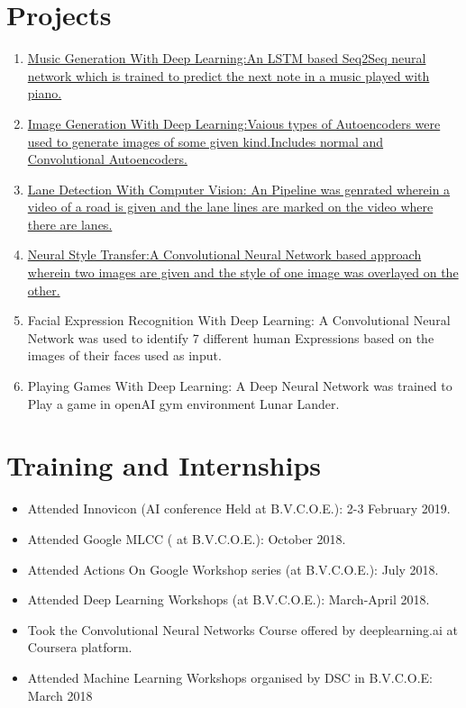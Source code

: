 \documentclass{my_cv}
\begin{document}
	\section{Projects}
	  \begin{enumerate}
	  	\item \href{https://github.com/anuj2110/lstm-music-gen}{Music Generation With Deep Learning:An LSTM based Seq2Seq neural network which is trained to predict the next note in a music played with piano.}
	  	
	  	\item \href{https://github.com/anuj2110/keras}{Image Generation With Deep Learning:Vaious types of Autoencoders were used to generate images of some given kind.Includes normal and Convolutional Autoencoders.}
	  	\item \href{https://github.com/anuj2110/LaneDetection}{ Lane Detection With Computer Vision:
	  		An Pipeline was genrated wherein a video of a road is given and the lane lines are marked on the video where there are lanes.}
	  	\item \href{https://github.com/anuj2110/neural-style-transfer}{Neural Style Transfer:A Convolutional Neural Network based approach wherein two images are given and the style of one image was overlayed on the other.}
	  	\item Facial Expression Recognition With Deep Learning:
	  	A Convolutional Neural Network was used to identify 7 different human Expressions based on the images of their faces used as input.
	  	\item Playing Games With Deep Learning: A Deep Neural Network was trained to Play a game in openAI gym environment Lunar Lander.
	  \end{enumerate}
	\section{Training and Internships}
		\begin{itemize}
			\item Attended Innovicon (AI conference Held at B.V.C.O.E.): 2-3 February 2019.
			\item Attended Google MLCC ( at B.V.C.O.E.): October 2018.
			\item Attended Actions On Google Workshop series (at B.V.C.O.E.): July 2018.
			\item Attended Deep Learning Workshops (at B.V.C.O.E.): March-April 2018.
			\item Took the Convolutional Neural Networks Course offered by deeplearning.ai at Coursera platform.
			\item Attended Machine Learning Workshops organised by DSC in B.V.C.O.E: March 2018
			 
		\end{itemize}
\end{document}
